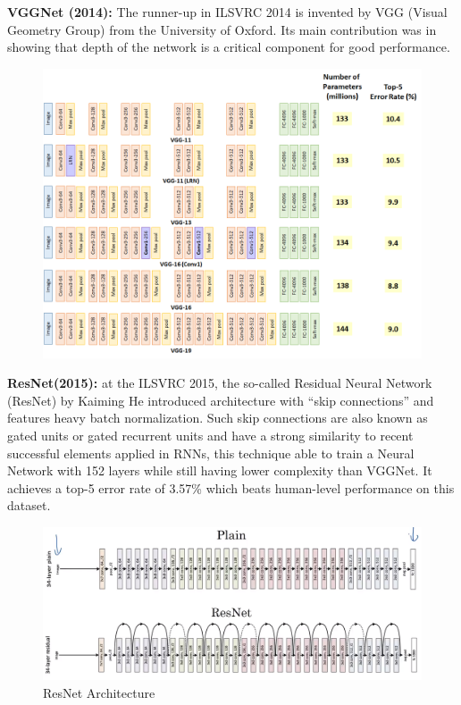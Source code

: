 \textbf{VGGNet (2014):} The runner-up in ILSVRC 2014 is invented by VGG (Visual Geometry Group) from the University of Oxford. Its main contribution was in showing that depth of the network is a critical component for good performance. 
\begin{center}
  \begin{figure}[H]
  \centering
  \includegraphics[width=1\columnwidth]{images/chap2/VGG_arch.png}
  \label{chap2:WSP}
  \end{figure}
\end{center}
\vspace{-1cm}
\textbf{ResNet(2015):} at the ILSVRC 2015, the so-called Residual Neural Network (ResNet) by Kaiming He introduced architecture with “skip connections” and features heavy batch normalization. Such skip connections are also known as gated units or gated recurrent units and have a strong similarity to recent successful elements applied in RNNs, this technique able to train a Neural Network with 152 layers while still having lower complexity than VGGNet. It achieves a top-5 error rate of 3.57\% which beats human-level performance on this dataset.
\begin{center}
  \begin{figure}[H]
  \centering
  \includegraphics[width=1\columnwidth]{images/chap2/ResNet_Plain_Vs_Res.png}
  \caption{ResNet Architecture}
  \label{chap2:WSP}
  \end{figure}
\end{center}
\vspace{-1cm}
